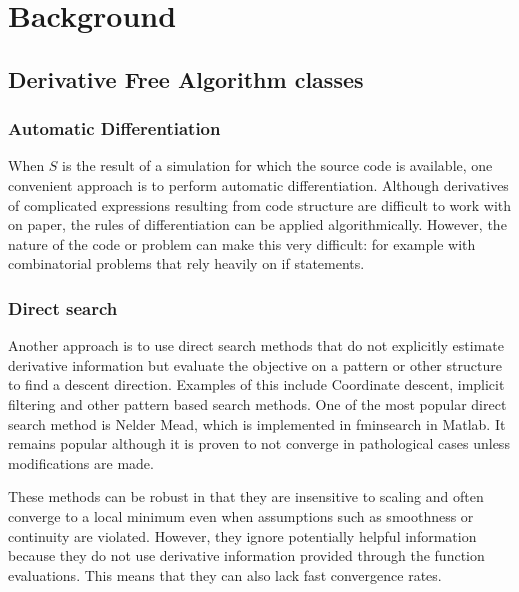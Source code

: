 \documentclass{article}
\begin{document}
%

\section{Background}
\subsection{Derivative Free Algorithm classes}
\subsubsection{Automatic Differentiation}

When $S$ is the result of a simulation for which the source code is available, one convenient approach is to perform automatic differentiation.
Although derivatives of complicated expressions resulting from code structure are difficult to work with on paper, the rules of differentiation can be applied algorithmically.
However, the nature of the code or problem can make this very difficult: for example with combinatorial problems that rely heavily on if statements.

\subsubsection{Direct search}


Another approach is to use direct search methods that do not explicitly estimate derivative information but evaluate the objective on a pattern or other structure to find a descent direction.
Examples of this include Coordinate descent, implicit filtering and other pattern based search methods.
One of the most popular direct search method is Nelder Mead, which is implemented in fminsearch in Matlab.
It remains popular although it is proven to not converge in pathological cases unless modifications are made.

These methods can be robust in that they are insensitive to scaling and often converge to a local minimum even when assumptions such as smoothness or continuity are violated.
However, they ignore potentially helpful information because they do not use derivative information provided through the function evaluations.
This means that they can also lack fast convergence rates.
\end{document}
